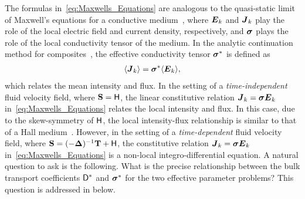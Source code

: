 \documentclass[amsa]{ipart}
\begin{document}
The formulas in~\eqref{eq:Maxwells_Equations} are analogous to the
quasi-static limit of Maxwell's equations for a conductive
medium~\cite{Golden:CMP-473,Milton:2002:TC}, where $\boldsymbol{E}_k$ and
$\boldsymbol{J}_k$ play the role of the local electric field and current
density, respectively, and $\mbox{\boldmath${\sigma}$}$ plays the role of the local
conductivity tensor of the medium. In the analytic continuation method
for composites~\cite{Golden:CMP-473,Milton:APL-300,Bergman:PRC-377},
the effective conductivity tensor $\mbox{\boldmath${\sigma}$}^*$ is defined as 
% 
\begin{align}\label{eq:sigma*}
  \langle\vecJ_k\rangle=\bsig^*\langle\vecE_k\rangle,
\end{align}
%
which relates the mean intensity and flux. In the setting of a
\emph{time-independent} fluid velocity field, where $\mathbf{S}=\mathsf{H}$, the
linear constitutive relation $\boldsymbol{J}_k=\mbox{\boldmath${\sigma}$}\boldsymbol{E}_k$
in~\eqref{eq:Maxwells_Equations} relates the local intensity and
flux. In this case, due to the skew-symmetry of $\mathsf{H}$, the local
intensity-flux relationship is similar to that of a Hall
medium~\cite{Isichenko:JNS:1991:375,Fannjiang:1994:SIAM_JAM:333,Novikov:2005:CPAM:867,Milton:2002:TC}. However, 
in the setting of a \emph{time-dependent} fluid velocity
field, where $\mathbf{S}=(-\mbox{\boldmath${\Delta}$})^{-1}\mathbf{T}+\mathsf{H}$, the constitutive relation
$\boldsymbol{J}_k=\mbox{\boldmath${\sigma}$}\boldsymbol{E}_k$ in~\eqref{eq:Maxwells_Equations} is a non-local 
integro-differential equation.  A natural question to ask is the
following. What is the precise relationship between the bulk transport
coefficients $\mathsf{D}^*$ and $\mbox{\boldmath${\sigma}$}^*$ for the two effective parameter
problems? This question is addressed in  below.  
\end{document}

